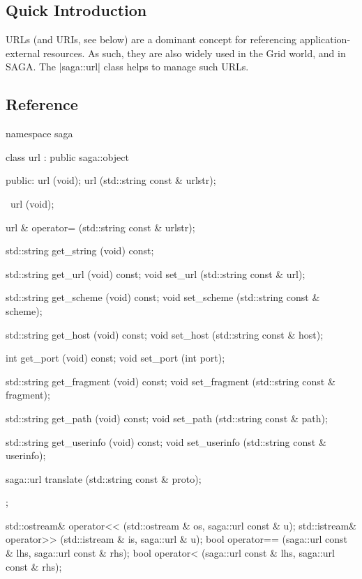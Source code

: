 
\subsection{Quick Introduction}

 URLs (and URIs, see below) are a dominant concept for referencing
 application-external resources.  As such, they are also widely used in
 the Grid world, and in SAGA.  The |saga::url| class helps to manage
 such URLs.

\subsection{Reference}

 \begin{mycode}[label=Prototype: saga::url]
  namespace saga 
  {
    class url 
        : public saga::object
    {
      public:
        url  (void);
        url  (std::string const & urlstr);

        ~url (void);

        url & operator= (std::string const & urlstr);

        std::string get_string   (void) const;

        std::string get_url      (void) const;
        void        set_url      (std::string const & url);

        std::string get_scheme   (void) const;
        void        set_scheme   (std::string const & scheme);

        std::string get_host     (void) const;
        void        set_host     (std::string const & host);

        int         get_port     (void) const;
        void        set_port     (int port);

        std::string get_fragment (void) const;
        void        set_fragment (std::string const & fragment);

        std::string get_path     (void) const;
        void        set_path     (std::string const & path);

        std::string get_userinfo (void) const;
        void        set_userinfo (std::string const & userinfo);

        saga::url translate    (std::string const & proto);
    };

  
    std::ostream& operator<< (std::ostream       & os, 
                              saga::url    const & u);
    std::istream& operator>> (std::istream       & is, 
                              saga::url          & u);
    bool          operator== (saga::url    const & lhs, 
                              saga::url    const & rhs);
    bool          operator<  (saga::url    const & lhs, 
                              saga::url    const & rhs);
  }
 \end{mycode}


